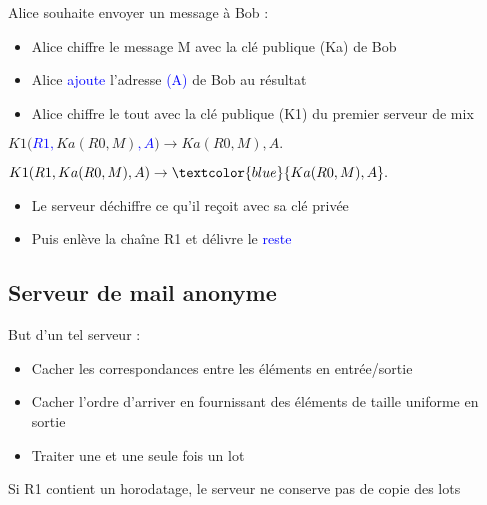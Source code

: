 \documentclass{beamer}
\begin{document}
\begin{frame}
Alice souhaite envoyer un message à Bob :
\begin{itemize}
[triangle]
\item Alice chiffre le message M avec la clé publique (Ka) de Bob
\item Alice \textcolor{blue}{ajoute} l'adresse \textcolor{blue}{(A)} de Bob au résultat
\item Alice chiffre le tout avec la clé publique (K1) du premier serveur de mix
\end{itemize}
\begin{center}
$K1( $\textcolor{blue}{$R1, $}$Ka( R0, M )$\textcolor{blue}{$, A$}$ ) \rightarrow Ka( R0, M ), A.$
\end{center}
\end{frame}

\begin{frame}
\begin{center}
$K1( R1, Ka( R0, M ), A ) \rightarrow \textcolor{blue}{Ka( R0, M ), A}.$
\end{center}

\begin{itemize}
[triangle]
\item Le serveur déchiffre ce qu'il reçoit avec sa clé privée
\item Puis enlève la chaîne R1 et délivre le \textcolor{blue}{reste}
\end{itemize}
\end{frame}

\subsection{Serveur de mail anonyme}
\begin{frame}
But d'un tel serveur :
\begin{itemize}
[triangle]
\item Cacher les correspondances entre les éléments en entrée/sortie
\item Cacher l'ordre d'arriver en fournissant des éléments de taille uniforme en sortie
\item Traiter une et une seule fois un lot
\end{itemize}
Si R1 contient un horodatage, le serveur ne conserve pas de copie des lots
\end{frame}
\end{document}
